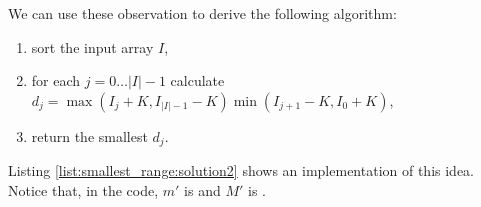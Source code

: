 We can use these observation to derive the following algorithm:
\begin{enumerate}
	\item sort the input array $I$,
	\item for each $j = 0 \ldots |I|-1$ calculate $d_j = \max{(I_j+K,I_{|I|-1}-K)} \min{(I_{j+1}-K, I_0 +K)}$,
	\item return the smallest $d_j$.
\end{enumerate}
Listing \ref{list:smallest_range:solution2} shows an implementation of this idea.
Notice that, in the code, $m'$ is  and $M'$ is .


